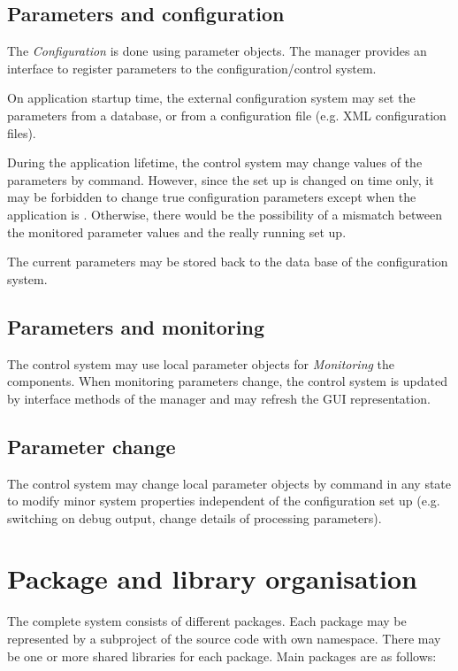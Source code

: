 \subsection{Parameters and configuration}
The {\sl Configuration} is done using parameter objects. The 
   manager provides an interface to register parameters to the
    configuration/control system.    
\begin{compactitem}[$\circ$]
\item  On application startup time, the external configuration system may 
      set the parameters from a database, or from a configuration file 
      (e.g. XML configuration files).
\item  During the application lifetime, the control system may change 
      values of the parameters by command. However, since the set 
      up is changed on  time only, it may be forbidden to change 
      true configuration parameters except when the application is . 
      Otherwise, there would be the possibility of a mismatch between the 
      monitored parameter values and the really running set up.
\item  The current parameters  may be stored back to the data 
      base of the configuration system.
\end{compactitem}
\subsection{Parameters and monitoring}
The control system may use local parameter objects for 
   {\sl Monitoring} the components. When monitoring parameters change, 
   the control system is updated by interface methods of the 
   manager and may refresh the GUI representation.
\subsection{Parameter change}
The control system may change local parameter objects 
   by command in any state to modify minor system properties 
   independent of the configuration set up (e.g. switching on 
   debug output, change details of processing parameters).


\section{Package and library organisation}
The complete system consists of different packages. 
Each package may be represented by a subproject of the source code with own namespace. 
There may be one or more shared libraries for each package. Main packages are as follows: 

